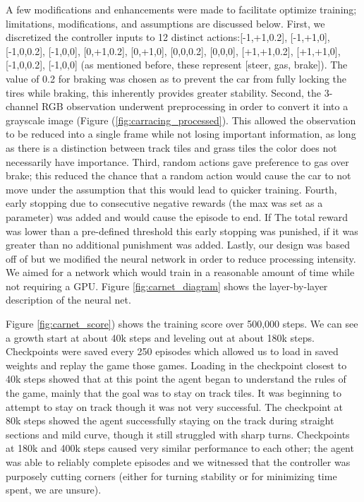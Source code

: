 \documentclass{article}
\begin{document}
A few modifications and enhancements were made to facilitate optimize training; limitations, modifications, and assumptions are discussed below. First, we discretized the controller inputs to 12 distinct actions:[-1,+1,0.2], [-1,+1,0], [-1,0,0.2], [-1,0,0], [0,+1,0.2], [0,+1,0], [0,0,0.2], [0,0,0], [+1,+1,0.2], [+1,+1,0], [-1,0,0.2], [-1,0,0] (as mentioned before, these represent [steer, gas, brake]). The value of 0.2 for braking was chosen as to prevent the car from fully locking the tires while braking, this inherently provides greater stability. Second, the 3-channel RGB observation underwent preprocessing in order to convert it into a grayscale image (Figure (\ref{fig:carracing_processed}). This allowed the observation to be reduced into a single frame while not losing important information, as long as there is a distinction between track tiles and grass tiles the color does not necessarily have importance. Third, random actions gave preference to gas over brake; this reduced the chance that a random action would cause the car to not move under the assumption that this would lead to quicker training. Fourth, early stopping due to consecutive negative rewards (the max was set as a parameter) was added and would cause the episode to end. If The total reward was lower than a pre-defined threshold this early stopping was punished, if it was greater than no additional punishment was added. Lastly, our design was based off of \cite{AtariDeepRI} but we modified the neural network in order to reduce processing intensity. We aimed for a network which would train in a reasonable amount of time while not requiring a GPU. Figure \ref{fig:carnet_diagram} shows the layer-by-layer description of the neural net. 

Figure \ref{fig:carnet_score}) shows the training score over 500,000 steps. We can see a growth start at about 40k steps and leveling out at about 180k steps. Checkpoints were saved every 250 episodes which allowed us to load in saved weights and replay the game those games. Loading in the checkpoint closest to 40k steps showed that at this point the agent began to understand the rules of the game, mainly that the goal was to stay on track tiles. It was beginning to attempt to stay on track though it was not very successful. The checkpoint at 80k steps showed the agent successfully staying on the track during straight sections and mild curve, though it still struggled with sharp turns. Checkpoints at 180k and 400k steps caused very similar performance to each other; the agent was able to reliably complete episodes and we witnessed that the controller was purposely cutting corners (either for turning stability or for minimizing time spent, we are unsure).
\end{document}
